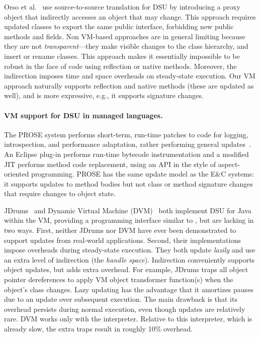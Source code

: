 Orso et al.~\cite{orso:java} use source-to-source translation for DSU
by introducing a proxy object that indirectly accesses
an object that may change.  
This approach requires updated classes to export the same public
interface, forbidding new public methods and
fields.
Non VM-based approaches are in general limiting because they are
not \emph{transparent}---they make visible changes to the class hierarchy,
and insert or rename classes.  This approach makes it essentially
impossible to be robust in the face of code using reflection or native
methods.  Moreover, the indirection imposes time and space overheads
on steady-state execution.  Our VM approach
naturally supports reflection and native methods (these are updated
as well), and is more expressive, e.g., it supports signature changes.

\paragraph{VM support for DSU in managed languages.} 
The PROSE system performs short-term, run-time patches to code for
logging, introspection, and performance adaptation, rather performing
general updates~\cite{nicoara:eurosys08}.  An Eclipse plug-in performs
run-time bytecode instrumentation and a modified JIT performs method
code replacement, using an API in the style of aspect-oriented
programming.  %
PROSE has the same update model as the E\&C systems: it supports updates to method bodies but not
class or method signature changes that require changes to object state. 

JDrums~\cite{ritzau00dynamic} and Dynamic Virtual Machine
(DVM)~\cite{Mala00a} both implement DSU for Java within the VM,
providing a programming interface similar to \DSU, but are lacking in
two ways.  First, neither JDrums nor DVM have ever been demonstrated
to support updates from real-world applications.  Second,
their implementations impose overheads during steady-state execution.
They both update \emph{lazily} and use
an extra level of indirection (the \emph{handle
  space}).  Indirection conveniently supports
object updates, but adds extra overhead.  For example, JDrums traps
all object pointer dereferences to apply VM object transformer
function(s) when the object's class changes.  Lazy updating has the
advantage that it amortizes  pauses due to an update over
subsequent execution.  The main drawback is that its overhead persists
during normal execution, even though updates are relatively rare.  DVM
works only with the interpreter.  Relative to this interpreter, which
is already slow, the extra traps result in roughly 10\% overhead.

